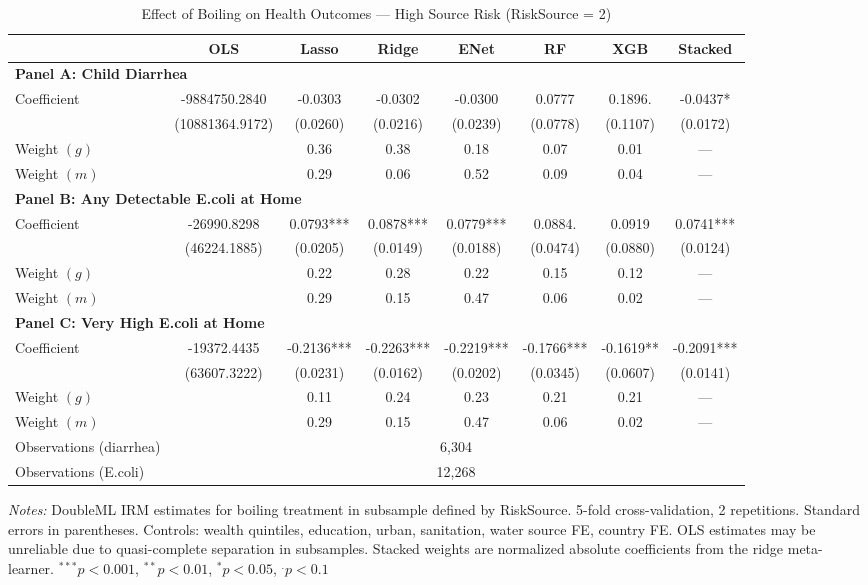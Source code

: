 \begin{table}[htbp]
\centering
\caption{Effect of Boiling on Health Outcomes --- High Source Risk (RiskSource = 2)}
\label{tab:subgroup_risk2}
\begin{tabular}{lccccccc}
\toprule
 & OLS & Lasso & Ridge & ENet & RF & XGB & Stacked \\
\midrule
\multicolumn{8}{l}{\textbf{Panel A: Child Diarrhea}} \\
\midrule
Coefficient & -9884750.2840 & -0.0303 & -0.0302 & -0.0300 & 0.0777 & 0.1896. & -0.0437* \\
 & (10881364.9172) & (0.0260) & (0.0216) & (0.0239) & (0.0778) & (0.1107) & (0.0172) \\
Weight $(g)$ &  & 0.36 & 0.38 & 0.18 & 0.07 & 0.01 & --- \\
Weight $(m)$ &  & 0.29 & 0.06 & 0.52 & 0.09 & 0.04 & --- \\

\multicolumn{8}{l}{\textbf{Panel B: Any Detectable E.coli at Home}} \\
\midrule
Coefficient & -26990.8298 & 0.0793*** & 0.0878*** & 0.0779*** & 0.0884. & 0.0919 & 0.0741*** \\
 & (46224.1885) & (0.0205) & (0.0149) & (0.0188) & (0.0474) & (0.0880) & (0.0124) \\
Weight $(g)$ &  & 0.22 & 0.28 & 0.22 & 0.15 & 0.12 & --- \\
Weight $(m)$ &  & 0.29 & 0.15 & 0.47 & 0.06 & 0.02 & --- \\

\multicolumn{8}{l}{\textbf{Panel C: Very High E.coli at Home}} \\
\midrule
Coefficient & -19372.4435 & -0.2136*** & -0.2263*** & -0.2219*** & -0.1766*** & -0.1619** & -0.2091*** \\
 & (63607.3222) & (0.0231) & (0.0162) & (0.0202) & (0.0345) & (0.0607) & (0.0141) \\
Weight $(g)$ &  & 0.11 & 0.24 & 0.23 & 0.21 & 0.21 & --- \\
Weight $(m)$ &  & 0.29 & 0.15 & 0.47 & 0.06 & 0.02 & --- \\

\midrule
Observations (diarrhea) & \multicolumn{7}{c}{6,304} \\
Observations (E.coli) & \multicolumn{7}{c}{12,268} \\
\bottomrule
\end{tabular}
\begin{minipage}{\textwidth}
\footnotesize
\textit{Notes:} DoubleML IRM estimates for boiling treatment in subsample defined by RiskSource. 
5-fold cross-validation, 2 repetitions. Standard errors in parentheses. 
Controls: wealth quintiles, education, urban, sanitation, water source FE, country FE. 
OLS estimates may be unreliable due to quasi-complete separation in subsamples. 
Stacked weights are normalized absolute coefficients from the ridge meta-learner. 
$^{***}p<0.001$, $^{**}p<0.01$, $^{*}p<0.05$, $^{.}p<0.1$
\end{minipage}
\end{table}
